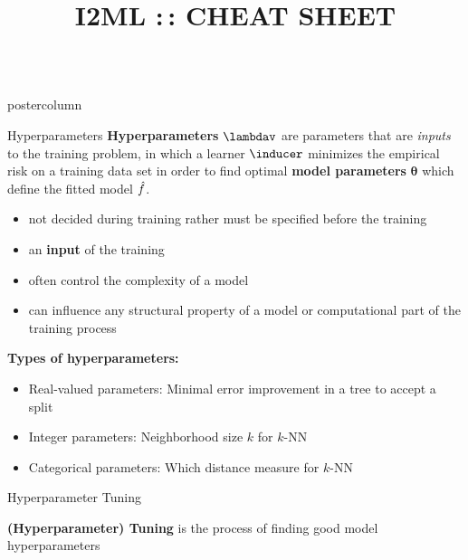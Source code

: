 \documentclass{beamer}
\title{I2ML :\,: CHEAT SHEET} %
\begin{document}
\begin{frame}[fragile]{}
\begin{columns}
	\begin{column}{.31\textwidth}
		\begin{beamercolorbox}[center]{postercolumn}
			\begin{minipage}{.98\textwidth}
				\parbox[t][\columnheight]{\textwidth}{
					\begin{myblock}{Hyperparameters}
						\textbf{Hyperparameters} $\lambdav$ are parameters that are \emph{inputs} to the training problem, in which a learner $\inducer$ minimizes the empirical risk on a training data set in order to find optimal \textbf{model parameters} $\bm{\theta}$ which define the fitted model $\hat{f}$.
						\begin{itemize}[$\bullet$]     
            \setlength{\itemindent}{+.3in}
                        \item not decided during training rather must be specified before the training
                        \item an \textbf{input} of the training
                        \item often control the complexity of a model
                        \item can influence any structural property of a model or computational part of the training process
                        \end{itemize}

						\begin{codebox}
			\textbf{Types of hyperparameters: }
						\end{codebox}
						\begin{itemize}[$\bullet$]     
            \setlength{\itemindent}{+.3in}
						    \item Real-valued parameters: Minimal error improvement in a tree to accept a split
						    \item Integer parameters: Neighborhood size $k$ for $k$-NN
						    \item Categorical parameters: Which distance measure for $k$-NN
						\end{itemize}
						\end{myblock}

						\begin{myblock}{Hyperparameter Tuning}

\textbf{(Hyperparameter) Tuning} is the process of finding good model hyperparameters


\end{myblock}}
\end{minipage}
\end{beamercolorbox}
\end{column}
\end{columns}
\end{frame}
\end{document}

